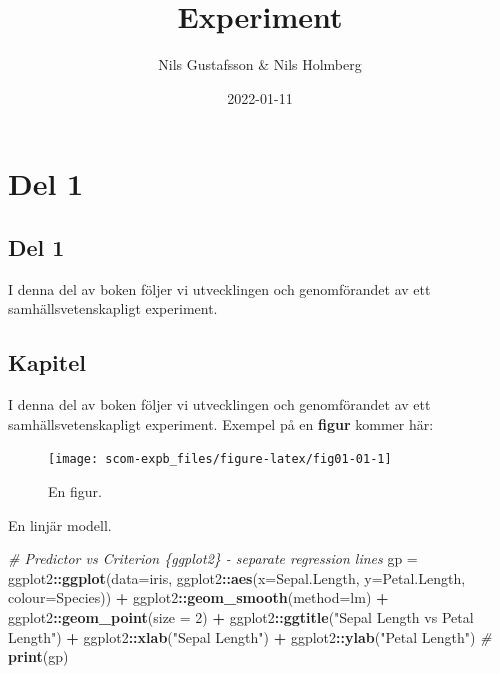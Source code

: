 \documentclass[
]{book}
\title{Experiment}
\author{Nils Gustafsson \& Nils Holmberg}
\date{2022-01-11}
\newenvironment{Shaded}{\begin{snugshade}}{\end{snugshade}}
\newcommand{\CommentTok}[1]{\textcolor[rgb]{0.56,0.35,0.01}{\textit{#1}}}
\newcommand{\DataTypeTok}[1]{\textcolor[rgb]{0.13,0.29,0.53}{#1}}
\newcommand{\DecValTok}[1]{\textcolor[rgb]{0.00,0.00,0.81}{#1}}
\newcommand{\KeywordTok}[1]{\textcolor[rgb]{0.13,0.29,0.53}{\textbf{#1}}}
\newcommand{\NormalTok}[1]{#1}
\newcommand{\OperatorTok}[1]{\textcolor[rgb]{0.81,0.36,0.00}{\textbf{#1}}}
\newcommand{\StringTok}[1]{\textcolor[rgb]{0.31,0.60,0.02}{#1}}
\begin{document}
\maketitle

{
\setcounter{tocdepth}{1}
\tableofcontents
}
\hypertarget{part-del-1}{%
\part{Del 1}\label{part-del-1}}

\hypertarget{del-1}{%
\chapter*{Del 1}\label{del-1}}

I denna del av boken följer vi utvecklingen och genomförandet av ett samhällsvetenskapligt experiment.

\hypertarget{chap01}{%
\chapter{Kapitel}\label{chap01}}

I denna del av boken följer vi utvecklingen och genomförandet av ett samhällsvetenskapligt experiment. Exempel på en \textbf{figur} kommer här:

\begin{figure}

{\centering \texttt{[image: scom-expb\_files/figure-latex/fig01-01-1]} 

}

\caption{En figur.}\label{fig:fig01-01}
\end{figure}

En linjär modell.

\begin{Shaded}
\begin{Highlighting}[]
\CommentTok{\# Predictor vs Criterion \{ggplot2\} {-} separate regression lines}
\NormalTok{gp =}\StringTok{ }\NormalTok{ggplot2}\OperatorTok{::}\KeywordTok{ggplot}\NormalTok{(}\DataTypeTok{data=}\NormalTok{iris, }
\NormalTok{ggplot2}\OperatorTok{::}\KeywordTok{aes}\NormalTok{(}\DataTypeTok{x=}\NormalTok{Sepal.Length,}
\DataTypeTok{y=}\NormalTok{Petal.Length,}
\DataTypeTok{colour=}\NormalTok{Species)) }\OperatorTok{+}\StringTok{ }
\NormalTok{ggplot2}\OperatorTok{::}\KeywordTok{geom\_smooth}\NormalTok{(}\DataTypeTok{method=}\NormalTok{lm) }\OperatorTok{+}\StringTok{ }
\NormalTok{ggplot2}\OperatorTok{::}\KeywordTok{geom\_point}\NormalTok{(}\DataTypeTok{size =} \DecValTok{2}\NormalTok{) }\OperatorTok{+}
\NormalTok{ggplot2}\OperatorTok{::}\KeywordTok{ggtitle}\NormalTok{(}\StringTok{"Sepal Length vs Petal Length"}\NormalTok{) }\OperatorTok{+}
\NormalTok{ggplot2}\OperatorTok{::}\KeywordTok{xlab}\NormalTok{(}\StringTok{"Sepal Length"}\NormalTok{) }\OperatorTok{+}\StringTok{ }\NormalTok{ggplot2}\OperatorTok{::}\KeywordTok{ylab}\NormalTok{(}\StringTok{"Petal Length"}\NormalTok{)}
\CommentTok{\#}
\KeywordTok{print}\NormalTok{(gp)}
\end{Highlighting}
\end{Shaded}
\end{document}
